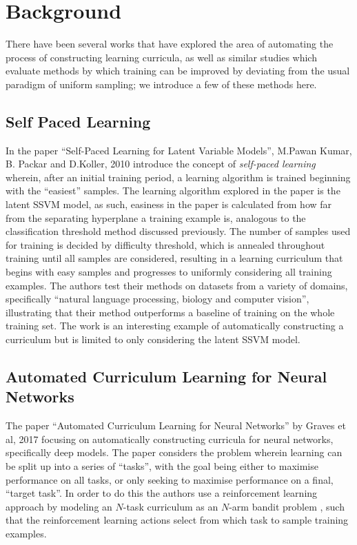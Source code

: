 \documentclass[a4paper,10pt]{article}
\begin{document}
\section{Background}
There have been several works that have explored the area of automating the process of constructing learning curricula, as well as similar studies which evaluate methods by which training can be improved by deviating from the usual paradigm of uniform sampling; we introduce a few of these methods here.
\subsection*{Self Paced Learning}
In the paper ``Self-Paced Learning for Latent Variable Models'', M.Pawan Kumar, B. Packar and D.Koller, 2010 \cite{Koller 2010} introduce the concept of \textit{self-paced learning} wherein, after an initial training period, a learning algorithm is trained beginning with the ``easiest'' samples. The learning algorithm explored in the paper is the latent SSVM model, as such, easiness in the paper is calculated from how far from the separating hyperplane a training example is, analogous to the classification threshold method discussed previously. The number of samples used for training is decided by difficulty threshold, which is annealed throughout training until all samples are considered, resulting in a learning curriculum that begins with easy samples and progresses to uniformly considering all training examples. The authors test their methods on datasets from a variety of domains, specifically ``natural language processing, biology and computer vision'', illustrating that their method outperforms a baseline of training on the whole training set. The work is an interesting example of automatically constructing a curriculum but is limited to only considering the latent SSVM model.
\subsection*{Automated Curriculum Learning for Neural Networks}
The paper ``Automated Curriculum Learning for Neural Networks'' by Graves et al, 2017 \cite{Graves 2017} focusing on automatically constructing curricula for neural networks, specifically deep models. The paper considers the problem wherein learning can be split up into a series of ``tasks'', with the goal being either to maximise performance on all tasks, or only seeking to maximise performance on a final, ``target task''. In order to do this the authors use a reinforcement learning approach by modeling an $N$-task curriculum as an $N$-arm bandit problem \cite{Bubeck 2012}, such that the reinforcement learning actions select from which task to sample training examples. 
\end{document}
